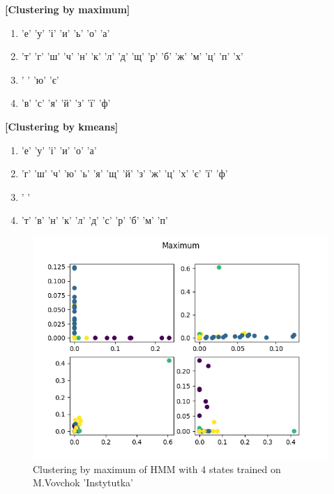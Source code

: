 \documentclass[12pt,a4paper]{article}
\begin{document}
  \textbf{[Clustering by maximum]}
  \begin{enumerate}
    \item 'е' 'у' 'і' 'и' 'ь' 'о' 'а'
    \item 'т' 'г' 'ш' 'ч' 'н' 'к' 'л' 'д' 'щ' 'р' 'б' 'ж' 'м' 'ц' 'п' 'х'
    \item ' ' 'ю' 'є'
    \item 'в' 'с' 'я' 'й' 'з' 'ї' 'ф'
  \end{enumerate}

  \textbf{[Clustering by kmeans]}
  \begin{enumerate}
    \item 'е' 'у' 'і' 'и' 'о' 'а'
    \item 'г' 'ш' 'ч' 'ю' 'ь' 'я' 'щ' 'й' 'з' 'ж' 'ц' 'х' 'є' 'ї' 'ф'
    \item ' '
    \item 'т' 'в' 'н' 'к' 'л' 'д' 'с' 'р' 'б' 'м' 'п'
  \end{enumerate}

  \begin{figure}[h]
    \includegraphics[width=\textwidth]{../plots/marko-instutytka-clustering-4-max-1670787549.9301946.png}
    \centering
    \caption{Clustering by maximum of HMM with 4 states trained on M.Vovchok 'Instytutka'}
  \end{figure}
\end{document}
